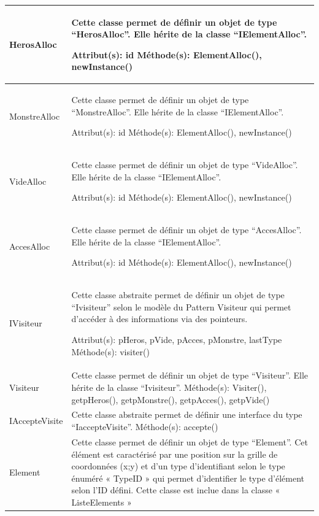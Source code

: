 \documentclass[11pt, a4paper]{article}
\begin{document}
\begin{tabularx}{\textwidth}{ |l|X| }
\hline
   HerosAlloc & Cette classe permet de définir un objet de type “HerosAlloc”. Elle hérite de la classe “IElementAlloc”.

Attribut(s): id
\newline
Méthode(s): ElementAlloc(), newInstance()
 \\
\hline

   MonstreAlloc & Cette classe permet de définir un objet de type “MonstreAlloc”. Elle hérite de la classe “IElementAlloc”.

Attribut(s): id
\newline
Méthode(s): ElementAlloc(), newInstance()
 \\
\hline

   VideAlloc & Cette classe permet de définir un objet de type “VideAlloc”. Elle hérite de la classe “IElementAlloc”.

Attribut(s): id
\newline
Méthode(s): ElementAlloc(), newInstance()
 \\
\hline

   AccesAlloc & Cette classe permet de définir un objet de type “AccesAlloc”. Elle hérite de la classe “IElementAlloc”.

Attribut(s): id
\newline
Méthode(s): ElementAlloc(), newInstance()
 \\
\hline

   IVisiteur & Cette classe abstraite permet de définir un objet de type “Ivisiteur” selon le modèle du Pattern Visiteur qui permet d’accéder à des informations via des pointeurs.

Attribut(s): pHeros, pVide, pAcces, pMonstre, lastType
\newline
Méthode(s): visiter()
 \\
\hline

   Visiteur & Cette classe permet de définir un objet de type “Visiteur”. Elle hérite de la classe “Ivisiteur”.
\newline
Méthode(s): Visiter(), getpHeros(), getpMonstre(), getpAcces(), getpVide()
 \\
\hline

   IAccepteVisite & Cette classe abstraite permet de définir une interface du type “IaccepteVisite”.
\newline
Méthode(s): accepte()
 \\
\hline

   Element & Cette classe permet de définir un objet de type “Element”. Cet élément est caractérisé par une position sur la grille de coordonnées (x;y) et d’un type d’identifiant selon le type énuméré « TypeID » qui permet d’identifier le type d’élément selon l’ID défini. Cette classe est inclue dans la classe « ListeElements »


\end{tabularx}
\end{document}
